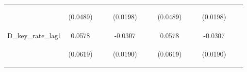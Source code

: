 \documentclass[]{article}
\begin{document}
\begin{center}
\begin{tabular}{lcccccccccccc}
\vspace{4pt} & \begin{footnotesize}(0.0489)\end{footnotesize} & \begin{footnotesize}\end{footnotesize} & \begin{footnotesize}\end{footnotesize} & \begin{footnotesize}(0.0198)\end{footnotesize} & \begin{footnotesize}\end{footnotesize} & \begin{footnotesize}\end{footnotesize} & \begin{footnotesize}(0.0489)\end{footnotesize} & \begin{footnotesize}\end{footnotesize} & \begin{footnotesize}\end{footnotesize} & \begin{footnotesize}(0.0198)\end{footnotesize} & \begin{footnotesize}\end{footnotesize} & \begin{footnotesize}\end{footnotesize} \\
D\_key\_rate\_lag1 & 0.0578 &  &  & -0.0307 &  &  & 0.0578 &  &  & -0.0307 &  &  \\
\vspace{4pt} & \begin{footnotesize}(0.0619)\end{footnotesize} & \begin{footnotesize}\end{footnotesize} & \begin{footnotesize}\end{footnotesize} & \begin{footnotesize}(0.0190)\end{footnotesize} & \begin{footnotesize}\end{footnotesize} & \begin{footnotesize}\end{footnotesize} & \begin{footnotesize}(0.0619)\end{footnotesize} & \begin{footnotesize}\end{footnotesize} & \begin{footnotesize}\end{footnotesize} & \begin{footnotesize}(0.0190)\end{footnotesize} & \begin{footnotesize}\end{footnotesize} & \begin{footnotesize}\end{footnotesize} \\

\end{tabular}
\end{center}
\end{document}
